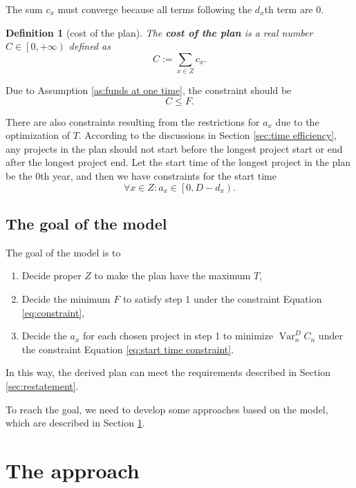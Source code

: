 \documentclass{article}
\DeclareMathOperator*{\var}{Var}
\newtheorem{definition}{Definition}
\begin{document}
The sum $c_x$ must converge because all terms following the $d_x$th term are $0$.

\begin{definition}[cost of the plan]
The \textbf{cost of the plan} is a real number $C\in\left[0,+\infty\right)$ defined as
\begin{equation}
C:=\sum_{x\in Z}c_x.
\end{equation}
\end{definition}

Due to Assumption \ref{as:funds at one time}, the constraint should be
\begin{equation}
\label{eq:constraint}
C\le F.
\end{equation}

There are also constraints resulting from the restrictions for $a_x$ due to the optimization of $T$.
According to the discussions in Section \ref{sec:time efficiency}, any projects in the plan should not start before the longest project start or end after the longest project end.
Let the start time of the longest project in the plan be the $0$th year, and then we have constraints for the start time
\begin{equation}
\label{eq:start time constraint}
\forall x\in Z:a_x\in\left[0,D-d_x\right).
\end{equation}

\subsection{The goal of the model}
\label{sec:goal}

The goal of the model is to
\begin{enumerate}
\item Decide proper $Z$ to make the plan have the maximum $T$,
\item Decide the minimum $F$ to satisfy step 1 under the constraint Equation \ref{eq:constraint},
\item Decide the $a_x$ for each chosen project in step 1 to minimize $\var_n^DC_n$ under the constraint Equation \ref{eq:start time constraint}.
\end{enumerate}

In this way, the derived plan can meet the requirements described in Section \ref{sec:restatement}.

To reach the goal, we need to develop some approaches based on the model,
which are described in Section \ref{sec:approach}.

\section{The approach}
\label{sec:approach}
\end{document}
